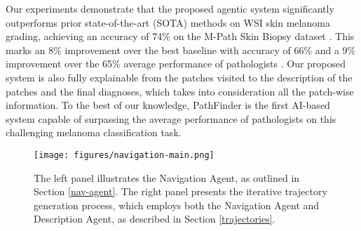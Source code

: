 Our experiments demonstrate that the proposed agentic system significantly outperforms prior state-of-the-art (SOTA) methods on WSI skin melanoma grading, achieving an accuracy of 74\% on the M-Path Skin Biopsy dataset \cite{elmore2017pathologists}. This marks an 8\% improvement over the best baseline with accuracy of 66\% and a 9\% improvement over the 65\% average performance of pathologists \cite{elmore2017pathologists}. Our proposed system is also fully explainable from the patches visited to the description of the patches and the final diagnoses, which takes into consideration all the patch-wise information. To the best of our knowledge, PathFinder is the first AI-based system capable of surpassing the average performance of pathologists on this challenging melanoma classification task.

\begin{figure*}[ht!]
\centering
\texttt{[image: figures/navigation-main.png]}
   \caption{The left panel illustrates the Navigation Agent, as outlined in Section \ref{nav-agent}. The right panel presents the iterative trajectory generation process, which employs both the Navigation Agent and Description Agent, as described in Section \ref{trajectories}.}
\label{fig:nav-pipeline}
\end{figure*}